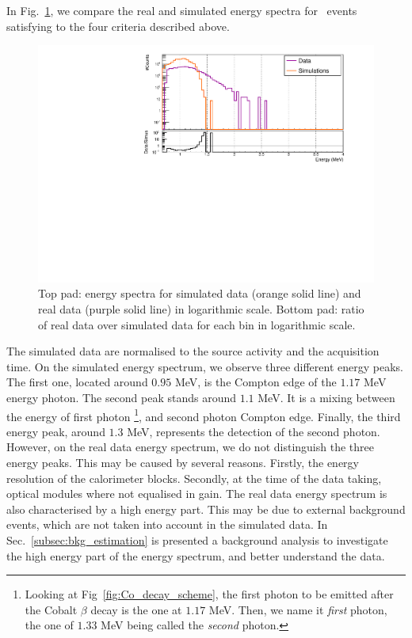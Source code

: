 In Fig.~\ref{fig:detector_efficiency}, we compare the real and simulated energy spectra for \Co\ events satisfying to the four criteria described above.
\begin{figure}[h]
  \centering
  \includegraphics[width=17cm]{commissioning/fig_commissioning/Co_efficiency_detector.pdf}
  \caption{Top pad: energy spectra for simulated data (orange solid line) and real data (purple solid line) in logarithmic scale.
    Bottom pad: ratio of real data over simulated data for each bin in logarithmic scale.
    \label{fig:detector_efficiency}}
\end{figure}
The simulated data are normalised to the source activity and the acquisition time.
On the simulated energy spectrum, we observe three different energy peaks.
The first one, located around $0.95$ MeV, is the Compton edge of the $1.17$ MeV energy photon.
The second peak stands around $1.1$ MeV. It is a mixing between the energy of first photon
\footnote{Looking at Fig~\ref{fig:Co_decay_scheme}, the first photon to be emitted after the Cobalt $\beta$ decay is the one at $1.17$ MeV.
  Then, we name it \emph{first} photon, the one of $1.33$ MeV being called the \emph{second} photon.}, and second photon Compton edge.
Finally, the third energy peak, around $1.3$ MeV, represents the detection of the second photon.
However, on the real data energy spectrum, we do not distinguish the three energy peaks.
This may be caused by several reasons.
Firstly, the energy resolution of the calorimeter blocks.
Secondly, at the time of the data taking, optical modules where not equalised in gain.
The real data energy spectrum is also characterised by a high energy part.
This may be due to external background events, which are not taken into account in the simulated data.
In Sec.~\ref{subsec:bkg_estimation} is presented a background analysis to investigate the high energy part of the energy spectrum, and better understand the data.


